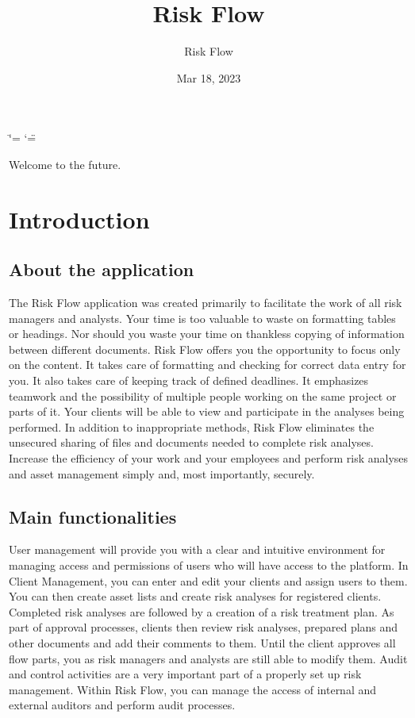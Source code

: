\documentclass[letterpaper,10pt,english]{sphinxmanual}
\title{Risk Flow}
\date{Mar 18, 2023}
\author{Risk Flow}
\begin{document}
\ifdefined\shorthandoff
  \ifnum\catcode`\=\string=\active\shorthandoff{=}\fi
  \ifnum\catcode`\"=\active{}\fi
\fi

\pagestyle{empty}
\sphinxmaketitle
\pagestyle{plain}
\sphinxtableofcontents
\pagestyle{normal}
\label{\detokenize{index::doc}}


\sphinxAtStartPar
Welcome to the future.

\sphinxstepscope


\chapter{Introduction}
\label{\detokenize{chapters/introduction:introduction}}\label{\detokenize{chapters/introduction::doc}}

\section{About the application}
\label{\detokenize{chapters/introduction:about-the-application}}
\sphinxAtStartPar
The Risk Flow application was created primarily to facilitate the work of all risk managers and analysts. Your time is too valuable to waste on formatting tables or headings. Nor should you waste your time on thankless copying of information between different documents. Risk Flow offers you the opportunity to focus only on the content. It takes care of formatting and checking for correct data entry for you. It also takes care of keeping track of defined deadlines. It emphasizes teamwork and the possibility of multiple people working on the same project or parts of it. Your clients will be able to view and participate in the analyses being performed. In addition to inappropriate methods, Risk Flow eliminates the unsecured sharing of files and documents needed to complete risk analyses. Increase the efficiency of your work and your employees and perform risk analyses and asset management simply and, most importantly, securely.


\section{Main functionalities}
\label{\detokenize{chapters/introduction:main-functionalities}}
\sphinxAtStartPar
User management will provide you with a clear and intuitive environment for managing access and permissions of users who will have access to the platform. In Client Management, you can enter and edit your clients and assign users to them. You can then create asset lists and create risk analyses for registered clients. Completed risk analyses are followed by a creation of a risk treatment plan. As part of approval processes, clients then review risk analyses, prepared plans and other documents and add their comments to them. Until the client approves all flow parts, you as risk managers and analysts are still able to modify them. Audit and control activities are a very important part of a properly set up risk management. Within Risk Flow, you can manage the access of internal and external auditors and perform audit processes.
\end{document}
